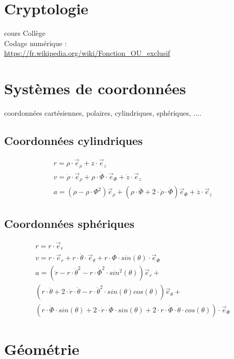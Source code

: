 \documentclass[12pt,a4paper,twoside]{article}
\numberwithin{equation}{subsection}
\begin{document}
\newpage
\section{Cryptologie}
cours Collège\\
Codage numérique :\\
\url{https://fr.wikipedia.org/wiki/Fonction_OU_exclusif}\\

\newpage
\section{Systèmes de coordonnées}
coordonnées cartésiennes, polaires, cylindriques, sphériques, ....\\
\subsection{Coordonnées cylindriques}
\begin{eqnarray}
r=\rho \cdot \vec{e}_{\rho}+z \cdot \vec{e}_z\\
v=\dot{\rho} \cdot \vec{e}_{\rho} + \rho \cdot \dot{\Phi}\cdot \vec{e}_{\Phi}+\dot{z}\cdot \vec{e}_z\\
a=(\ddot{\rho}-\rho \cdot \Phi^2)\vec{e}_{\rho}+(\rho \cdot \ddot{\Phi}+2 \cdot \dot{\rho}\cdot \dot{\Phi})\vec{e}_{\Phi}+\dot{z}\cdot \vec{e}_z
\end{eqnarray}

\subsection{Coordonnées sphériques}

\begin{eqnarray}
r=r \cdot \vec{e}_r\\
v=r \cdot \vec{e}_{r} + r \cdot \dot{\theta}\cdot \vec{e}_{\theta}+r \cdot \Phi\cdot sin(\theta) \cdot \vec{e}_{\Phi}\\
a=(\ddot{r}-r \cdot \dot{\theta}^2-r\cdot \dot{\Phi}^2 \cdot sin^2(\theta))\vec{e}_{r}+\\
(r \cdot \ddot{\theta}+2 \cdot \dot{r}\cdot \dot{\theta}-r\cdot \dot{\theta}^2 \cdot sin(\theta)cos(\theta))\vec{e}_{\theta}+\\
(r \cdot \ddot{\Phi} \cdot sin(\theta)+2 \cdot \dot{r} \cdot \dot{\Phi} \cdot sin(\theta)+2 \cdot r \cdot \dot{\Phi} \cdot \dot{\theta} \cdot cos(\theta))\cdot \vec{e}_{\Phi}
\end{eqnarray}

\newpage
\section{Géométrie}
\end{document}
